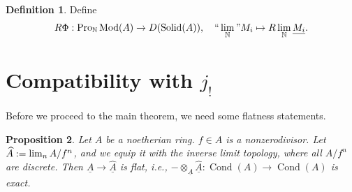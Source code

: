 \documentclass[11pt]{amsart}
\newcommand{\ra}{\rightarrow} %
\newcommand{\N}{\mathbb{N}}
\newcommand{\Mod}{\operatorname{Mod}}
\renewcommand{\lim}{\operatornamewithlimits{\rm{lim}}}
\newcommand{\Cond}{\operatorname{Cond}}
\newcommand{\Solid}{\operatorname{Solid}}
\renewcommand{\hat}{\widehat} %
\newcommand{\ul}{\underline}
\newcommand{\Pro}{\operatorname{Pro}}
\theoremstyle{plain}
\newtheorem{prop}{Proposition}[section]
\theoremstyle{definition}
\newtheorem{defn}[prop]{Definition}
\numberwithin{equation}{prop}
\begin{document}
\begin{defn}\label{RPhiDef}
Define
$$R\Phi: \Pro_{\N}\Mod(A)\ra D(\Solid(A)),\quad ``\lim_\N" M_i\mapsto R\lim_\N \ul{M_i}.$$
\end{defn}



















\section{Compatibility with $j_!$}


Before we proceed to the main theorem, we need some flatness statements.
\begin{prop}\label{flatmodvsflatcondmod}
Let $A$ be a noetherian ring. $f\in A$ is a nonzerodivisor.
Let $\hat A:=\lim_n A/f^n$, and we equip it with the inverse limit topology, where all $A/f^n$ are discrete. 
Then $\ul A\ra \ul{\hat A}$ is flat, i.e., $-\otimes_{\ul A} \ul {\hat A}:\Cond(A)\ra \Cond(A)$ is exact.
\end{prop}
\end{document}
